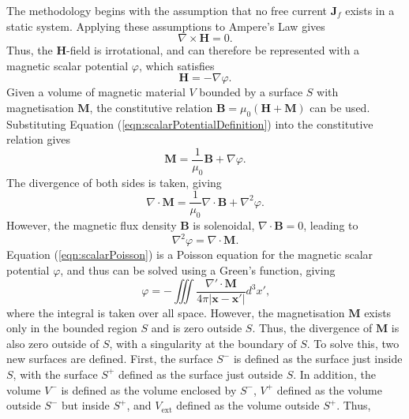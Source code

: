 The methodology begins with the assumption that no free current \(\mathbf{J}_f\) exists in a static system. Applying these assumptions to Ampere's Law gives
\begin{equation}
    \nabla \times \mathbf{H} = 0 \text{.}
\end{equation}
Thus, the \(\mathbf{H}\)-field is irrotational, and can therefore be represented with a magnetic scalar potential \(\varphi\), which satisfies
\begin{equation}\label{eqn:scalarPotentialDefinition}
    \mathbf{H} = -\nabla \varphi \text{.}
\end{equation}
Given a volume of magnetic material \(V\) bounded by a surface \(S\) with magnetisation \(\mathbf{M}\), the constitutive relation \(\mathbf{B} = \mu_0 \left( \mathbf{H} + \mathbf{M} \right)\) can be used. Substituting Equation (\ref{eqn:scalarPotentialDefinition}) into the constitutive relation gives
\begin{equation}
    \mathbf{M} = \frac{1}{\mu_0} \mathbf{B} + \nabla \varphi \text{.}
\end{equation}
The divergence of both sides is taken, giving
\begin{equation}
    \nabla \cdot \mathbf{M} = \frac{1}{\mu_0} \nabla \cdot \mathbf{B} + \nabla^2 \varphi \text{.}
\end{equation}
However, the magnetic flux density \(\mathbf{B}\) is solenoidal, \(\nabla \cdot \mathbf{B} = 0\), leading to
\begin{equation}\label{eqn:scalarPoisson}
     \nabla^2 \varphi = \nabla \cdot \mathbf{M} \text{.}
\end{equation}
Equation (\ref{eqn:scalarPoisson}) is a Poisson equation for the magnetic scalar potential \(\varphi\), and thus can be solved using a Green's function, giving
\begin{equation}
    \varphi = -\iiint \frac{\nabla' \cdot \mathbf{M}}{4\pi \left| \mathbf{x} - \mathbf{x}' \right|} d^3x' \text{,}
\end{equation}
where the integral is taken over all space. However, the magnetisation \(\mathbf{M}\) exists only in the bounded region \(S\) and is zero outside \(S\). Thus, the divergence of \(\mathbf{M}\) is also zero outside of \(S\), with a singularity at the boundary of \(S\). To solve this, two new surfaces are defined. First, the surface \(S^-\) is defined as the surface just inside \(S\), with the surface \(S^+\) defined as the surface just outside \(S\). In addition, the volume \(V^-\) is defined as the volume enclosed by \(S^-\), \(V^+\) defined as the volume outside \(S^-\) but inside \(S^+\), and \(V_\text{ext}\) defined as the volume outside \(S^+\). Thus,
